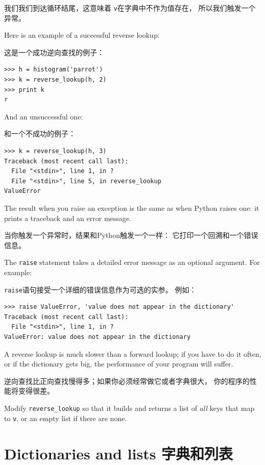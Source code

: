 \documentclass[10pt]{book}
\begin{document}
\begin{CJK}{UTF8}{gbsn}
我们我们到达循环结尾，这意味着 {\tt v}在字典中不作为值存在，
所以我们触发一个异常。

Here is an example of a successful reverse lookup:

这是一个成功逆向查找的例子：

\begin{verbatim}
>>> h = histogram('parrot')
>>> k = reverse_lookup(h, 2)
>>> print k
r
\end{verbatim}
%
And an unsuccessful one:

和一个不成功的例子：

\begin{verbatim}
>>> k = reverse_lookup(h, 3)
Traceback (most recent call last):
  File "<stdin>", line 1, in ?
  File "<stdin>", line 5, in reverse_lookup
ValueError
\end{verbatim}
%
The result when you raise an exception is the same as when
Python raises one: it prints a traceback and an error message.

当你触发一个异常时，结果和Python触发一个一样：
它打印一个回溯和一个错误信息。

The {\tt raise} statement takes a detailed error message as an
optional argument.  For example:

{\tt raise}语句接受一个详细的错误信息作为可选的实参。
例如：

\begin{verbatim}
>>> raise ValueError, 'value does not appear in the dictionary'
Traceback (most recent call last):
  File "<stdin>", line 1, in ?
ValueError: value does not appear in the dictionary
\end{verbatim}
%
A reverse lookup is much slower than a forward lookup; if you
have to do it often, or if the dictionary gets big, the performance
of your program will suffer.

逆向查找比正向查找慢得多；如果你必须经常做它或者字典很大，
你的程序的性能将变得很差。

\begin{exercise}

Modify \verb"reverse_lookup" so that it builds and returns a list
of {\em all} keys that map to {\tt v}, or an empty list if there
are none.

\end{exercise}


\section{Dictionaries and lists 字典和列表}
\label{invert}


\end{CJK}
\end{document}

